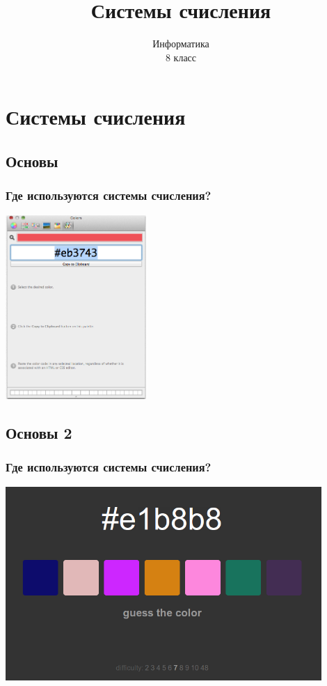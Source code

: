 \documentclass[compress,red]{beamer}
\title{Системы счисления}
\author{Информатика \\ 8 класс}
\begin{document}
\maketitle

\section{Системы счисления}

\subsection{Основы}
\begin{frame}[fragile]
  \frametitle{Где используются системы счисления?}
  \centerline{\includegraphics[width=0.4\textwidth]{images/pixelmator.png}}
\end{frame}

\subsection{Основы 2}
\begin{frame}[fragile]
  \frametitle{Где используются системы счисления?}
  \centerline{\includegraphics[width=0.9\textwidth]{images/guess-color.png}}
\end{frame}
\end{document}
